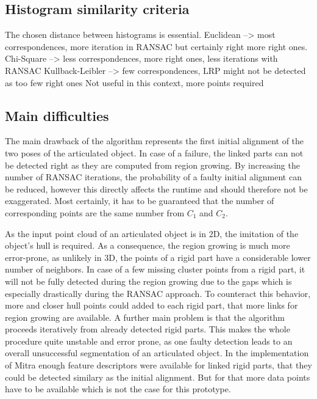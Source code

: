 
\subsection{Histogram similarity criteria}
The chosen distance between histograms is essential. Euclidean --> most correspondences, more iteration in RANSAC but certainly right more right ones.
Chi-Square --> less correspondences, more right ones, less iterations with RANSAC
Kullback-Leibler --> few correspondences, LRP might not be detected as too few right ones
Not useful in this context, more points required

\subsection{Main difficulties}
The main drawback of the algorithm represents the first initial alignment of the two poses of the articulated object. In case of a failure, the linked parts can not be detected right as they are computed from region growing. By increasing the number of RANSAC iterations, the probability of a faulty initial alignment can be reduced, however this directly affects the runtime and should therefore not be exaggerated. Most certainly, it has to be guaranteed that the number of corresponding points are the same number from $C_1$ and $C_2$.


As the input point cloud of an articulated object is in 2D, the imitation of the object's hull is required. As a consequence, the region growing is much more error-prone, as unlikely in 3D, the points of a rigid part have a considerable lower number of neighbors. In case of a few missing cluster points from a rigid part, it will not be fully detected during the region growing due to the gaps which is especially drastically during the RANSAC approach. To counteract this behavior, more and closer hull points could added to each rigid part, that more links for region growing are available. A further main problem is that the algorithm proceeds iteratively from already detected rigid parts. This makes the whole procedure quite unstable and error prone, as one faulty detection leads to an overall unsuccessful segmentation of an articulated object. In the implementation of Mitra enough feature descriptors were available for linked rigid parts, that they could be detected similary as the initial alignment. But for that more data points have to be available which is not the case for this prototype.

